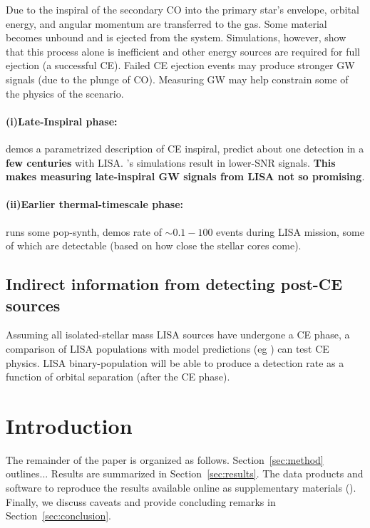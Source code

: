 \documentclass[floatfix,ApJL, twocolumn]{aastex631}
\begin{document}
Due to the inspiral of the secondary CO into the primary star’s envelope, orbital energy, and angular momentum are transferred to the gas. Some material becomes unbound and is ejected from the system. Simulations, however, show that this process alone is inefficient and other energy sources \cite[e.g. ionization of envelope material][]{Roepke:2022:arXiv} are required for full ejection (a successful CE).
Failed CE ejection events may produce stronger GW signals (due to the plunge of CO). Measuring GW may help constrain some of the physics of the scenario.


\paragraph{\textbf{(i)Late-Inspiral phase:}}
\cite{Ginat:2020:MNRAS} demos a parametrized description of CE inspiral,  predict about one detection in a \textbf{few centuries} with LISA. \cite{Ohlmann:2016:ApJL}'s simulations result in lower-SNR signals.
\textbf{This makes measuring late-inspiral GW signals from LISA not so promising}.

\paragraph{\textbf{(ii)Earlier thermal-timescale phase:}}
\cite{Renzo:2021:ApJ} runs some pop-synth, demos rate of $\sim0.1-100$ events during LISA mission, some of which are detectable (based on how close the stellar cores come).



\subsection{Indirect information from detecting post-CE sources}
Assuming all isolated-stellar mass LISA sources have undergone a CE phase, a comparison of LISA populations with model predictions (eg \cite{Wagg:2022:ApJ}) can test CE physics.
LISA binary-population will be able to produce a detection rate as a function of orbital separation (after the CE phase).



\section{Introduction}\label{sec:intro}

The remainder of the paper is organized as follows.
Section~\ref{sec:method} outlines...
Results are summarized in Section~\ref{sec:results}.
The data products and software to reproduce the results available online as supplementary materials (\projectUrl).
Finally, we discuss caveats and provide concluding remarks in Section~\ref{sec:conclusion}.
\end{document}
